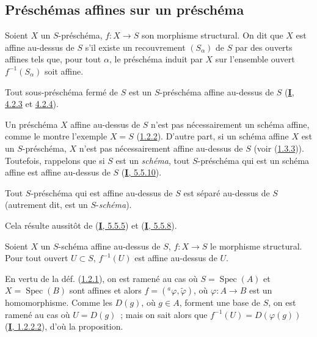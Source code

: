 \subsection{Préschémas affines sur un préschéma}
\label{subsection:II.1.2-fr}

\begin{definition}[1.2.1]
\label{II.1.2.1-fr}
Soient $X$ un $S$-préschéma, $f:X\to S$ son morphisme structural. On dit que
$X$ est affine au-dessus de $S$ s'il existe un recouvrement
$(S_\alpha)$ de $S$ par des ouverts affines tels que, pour tout $\alpha$, le
préschéma induit par $X$ sur l'ensemble ouvert $f^{-1}(S_\alpha)$ soit affine.
\end{definition}

\begin{example}[1.2.2]
\label{II.1.2.2-fr}
Tout sous-préschéma fermé de $S$ est un $S$-préschéma affine au-dessus de $S$
(\hyperref[I.4.2.3-fr]{\textbf{I}, 4.2.3} et
\hyperref[I.4.2.4-fr]{4.2.4}).
\end{example}

\begin{remark}[1.2.3]
\label{II.1.2.3-fr}
Un préschéma $X$ affine au-dessus de $S$ n'est pas nécessairement un schéma
affine, comme le montre l'exemple $X=S$ (\hyperref[II.1.2.2-fr]{1.2.2}).
D'autre part, si un schéma affine $X$ est un $S$-préschéma, $X$ n'est pas
nécessairement affine au-dessus
de $S$ (voir (\hyperref[II.1.3.3-fr]{1.3.3})). Toutefois, rappelons que si
$S$ est un \emph{schéma}, tout $S$-préschéma qui est un schéma affine est
affine au-dessus de $S$ (\hyperref[I.5.5.10-fr]{\textbf{I}, 5.5.10}).
\end{remark}

\begin{proposition}[1.2.4]
\label{II.1.2.4-fr}
Tout $S$-préschéma qui est affine au-dessus de $S$ est séparé au-dessus de
$S$ \textup{(autrement dit, est un $S$-\emph{schéma})}.
\end{proposition}

Cela résulte aussitôt de (\hyperref[I.5.5.5-fr]{\textbf{I}, 5.5.5}) et
(\hyperref[I.5.5.8-fr]{\textbf{I}, 5.5.8}).

\begin{proposition}[1.2.5]
\label{II.1.2.5-fr}
Soient $X$ un $S$-schéma affine au-dessus de $S$, $f:X\to S$ le morphisme
structural. Pour tout ouvert $U\subset S$, $f^{-1}(U)$ est affine au-dessus
de $U$.
\end{proposition}

En vertu de la déf. (\hyperref[II.1.2.1-fr]{1.2.1}), on est ramené au cas où
$S=\operatorname{Spec}(A)$ et $X=\operatorname{Spec}(B)$ sont affines et
alors $f=({}^a\varphi,\widetilde{\varphi})$, où $\varphi:A\to B$ est un
homomorphisme. Comme les $D(g)$, où $g\in A$, forment une base de $S$, on est
ramené au cas où $U=D(g)$~; mais on sait alors que
$f^{-1}(U)=D(\varphi(g))$ (\hyperref[I.1.2.2.2-fr]{\textbf{I}, 1.2.2.2}), d'où la
proposition.

